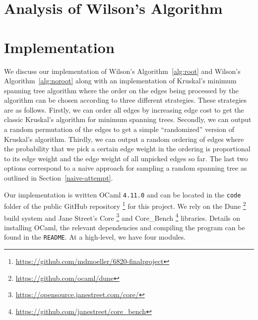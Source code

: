 \documentclass[11pt]{article}
\begin{document}
\section{Analysis of Wilson's Algorithm}


\section{Implementation}\label{imp}

We discuss our implementation of Wilson's Algorithm~\ref{alg:root} and Wilson's Algorithm~\ref{alg:noroot} along with an implementation of Kruskal's minimum spanning tree algorithm where the order on the edges being processed by the algorithm can be chosen according to three different strategies. These strategies are as follows. Firstly, we can order all edges by increasing edge cost to get the classic Kruskal's algorithm for minimum spanning trees. Secondly, we can output a random permutation of the edges to get a simple ``randomized'' version of Kruskal's algorithm. Thirdly, we can output a random ordering of edges where the probability that we pick a certain edge weight in the ordering is proportional to its edge weight and the edge weight of all unpicked edges so far. The last two options correspond to a naive approach for sampling a random spanning tree as outlined in Section~\ref{naive-attempt}.

Our implementation is written OCaml \texttt{4.11.0} and can be located in the \texttt{code} folder of the public GitHub repository \footnote{\url{https://github.com/mdmoeller/6820-finalproject}} for this project. We rely on the Dune \footnote{\url{https://github.com/ocaml/dune}} build system and Jane Street's Core \footnote{\url{https://opensource.janestreet.com/core/}} and Core\_Bench \footnote{\url{https://github.com/janestreet/core_bench}} libraries. Details on installing OCaml, the relevant dependencies and compiling the program can be found in the \texttt{README}. At a high-level, we have four modules.
\end{document}
